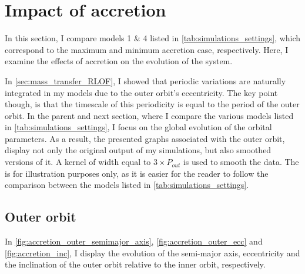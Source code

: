 \section{Impact of accretion}\label{sec:accretion}

In this section, I compare models  1 \& 4 listed in \cref{tab:simulations_settings}, which correspond to the maximum and minimum accretion case, respectively. Here, I examine the effects of accretion on the evolution of the system.

In \cref{sec:mass_transfer_RLOF}, I showed that periodic variations are naturally integrated in my models due to the outer orbit's eccentricity. The key point though, is that the timescale of this periodicity is equal to the period of the outer orbit. In the parent and next section, where I compare the various models listed in \cref{tab:simulations_settings}, I focus on the global evolution of the orbital parameters. As a result, the presented graphs associated with the outer orbit, display not only the original output of my simulations, but also smoothed versions of it. A kernel of width equal to $3 \times P_{out}$ is used to smooth the data. The is for illustration purposes only, as it is easier for the reader to follow the comparison between the models listed in \cref{tab:simulations_settings}. 

\subsection{Outer orbit}
In \cref{fig:accretion_outer_semimajor_axis}, \cref{fig:accretion_outer_ecc} and \cref{fig:accretion_inc}, I display the evolution of the semi-major axis, eccentricity and the inclination of the outer orbit relative to the inner orbit, respectively.

